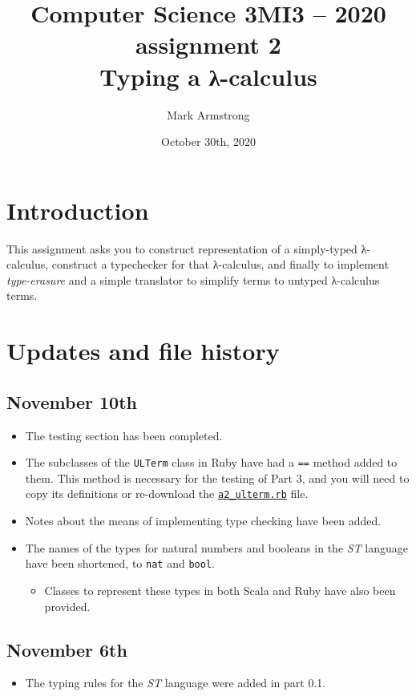 \documentclass[11pt]{article}
\author{Mark Armstrong}
\date{October 30th, 2020}
\title{Computer Science 3MI3 – 2020 assignment 2\\\medskip
\large Typing a λ-calculus}
\theoremstyle{definition}
\begin{document}
\maketitle
\tableofcontents


\section*{Introduction}
\label{sec:org73f5e72}
This assignment asks you to construct representation
of a simply-typed λ-calculus, construct a typechecker for that
λ-calculus, and finally to implement \emph{type-erasure} and a
simple translator to simplify terms to untyped λ-calculus terms.

\section*{Updates and file history}
\label{sec:org5682bad}
\subsection*{November 10th}
\label{sec:org05e0eaa}
\begin{itemize}
\item The testing section has been completed.
\item The subclasses of the \texttt{ULTerm} class in Ruby have had
a \texttt{==} method added to them. This method
is necessary for the testing of Part 3,
and you will need to copy its definitions or
re-download the \href{./src/a2\_ulterm.rb}{\texttt{a2\_ulterm.rb}} file.
\item Notes about the means of implementing type checking have been added.
\item The names of the types for natural numbers and booleans
in the \emph{ST} language have been shortened, to \texttt{nat} and \texttt{bool}.
\begin{itemize}
\item Classes to represent these types in both Scala and Ruby
have also been provided.
\end{itemize}
\end{itemize}

\subsection*{November 6th}
\label{sec:orgb533a0a}
\begin{itemize}
\item The typing rules for the \emph{ST} language were added
in part 0.1.
\end{itemize}
\end{document}
